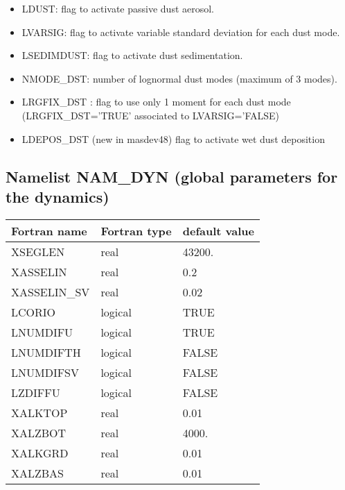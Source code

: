 \begin{itemize}

\item LDUST: flag to activate passive dust aerosol.
\item LVARSIG: flag to activate variable standard deviation for each dust mode.
\item LSEDIMDUST: flag to activate dust sedimentation.
\item  NMODE\_DST: number of lognormal dust modes (maximum of 3 modes).
\item LRGFIX\_DST : flag to use only 1 moment for each dust mode (LRGFIX\_DST='TRUE' associated to LVARSIG='FALSE)
\item LDEPOS\_DST (new in masdev48) flag to activate wet dust deposition  
\end{itemize}
\subsection{Namelist NAM\_DYN (global parameters for the dynamics)}

\begin{center}
\begin{tabular} {|l|l|l|}
\hline
Fortran name & Fortran type & default value \\
\hline
XSEGLEN     &  real   & 43200.   \\
XASSELIN    & real    & 0.2      \\
XASSELIN\_SV & real    & 0.02     \\
LCORIO      & logical & TRUE     \\
LNUMDIFU    & logical & TRUE    \\
LNUMDIFTH   & logical & FALSE    \\
LNUMDIFSV   & logical & FALSE    \\
LZDIFFU     & logical & FALSE    \\
XALKTOP     & real    & 0.01     \\
XALZBOT     & real    & 4000.    \\
XALKGRD     & real    & 0.01     \\
XALZBAS     & real    & 0.01     \\
\hline 
\end{tabular}
\end{center}



